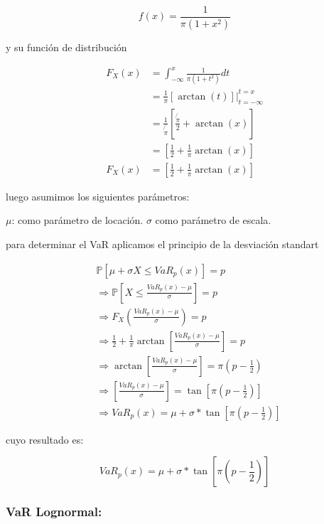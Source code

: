 \documentclass[]{article}
\begin{document}
\[f(x)= \frac{1}{\pi(1+x^2)}\]

y su función de distribución

\[\begin{array}{rl}
F_{X}(x) &=\int_{-\infty}^{x} \frac{1}{\pi(1+t^2)}dt\\
&\displaystyle =\frac{1}{\pi} \left[ \arctan(t) \right] \big |_{t=-\infty}^{t=x}\\
&\displaystyle =\frac{1}{\not{\pi}} \left[ \frac{\not{\pi}}{2}+ \arctan(x)\right]\\
&\displaystyle =\left[ \frac{1}{2} + \frac{1}{\pi}\arctan(x)\right]\\
F_{X}(x) &=\left[ \frac{1}{2} + \frac{1}{\pi}\arctan(x)\right]
\end{array}\]

luego asumimos los siguientes parámetros:

\(\mu\): como parámetro de locación. \(\sigma\) como parámetro de
escala.

para determinar el VaR aplicamos el principio de la desviación standart

\[\begin{array}{rl}  
&\displaystyle  \mathbb{P}[\mu + \sigma X \leq VaR_{p}(x)] = p\\
&\displaystyle  \Rightarrow \mathbb{P}[X \leq \frac{VaR_{p}(x)- \mu}{\sigma}] = p\\
&\displaystyle  \Rightarrow F_{X}(\frac{VaR_{p}(x)- \mu}{\sigma}) = p\\
&\displaystyle  \Rightarrow \frac{1}{2} + \frac{1}{\pi}\arctan\left[\frac{VaR_{p}(x) - \mu}{\sigma}\right] = p\\
&\displaystyle  \Rightarrow \arctan\left[\frac{VaR_{p}(x) - \mu}{\sigma}\right] = \pi(p-\frac{1}{2})\\
&\displaystyle  \Rightarrow \left[\frac{VaR_{p}(x) - \mu}{\sigma}\right] = \tan\left[\pi(p-\frac{1}{2})\right]\\
&\displaystyle  \Rightarrow VaR_p(x)=\mu+\sigma*\tan\left[\pi\left(p-\frac{1}{2}\right)\right]
\end{array}\]

cuyo resultado es:

\[VaR_p(x)=\mu+\sigma*\tan\left[\pi\left(p-\frac{1}{2}\right)\right]\]

\hypertarget{var-lognormal}{%
\subsubsection{\texorpdfstring{\textbf{VaR
Lognormal:}}{VaR Lognormal:}}\label{var-lognormal}}
\end{document}
